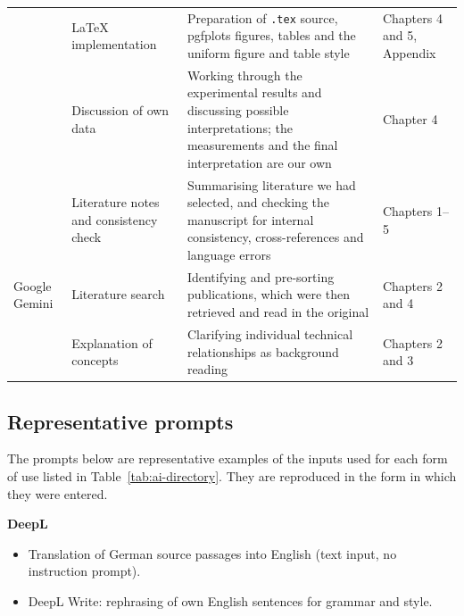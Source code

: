\begin{table}[H]
\begin{tabularx}{\textwidth}{L{2.2cm} L{3.0cm} X L{2.6cm}}
&
\LaTeX{} implementation &
Preparation of \texttt{.tex} source, pgfplots figures, tables and the uniform
figure and table style &
Chapters 4 and 5, Appendix \\
\addlinespace

&
Discussion of own data &
Working through the experimental results and discussing possible interpretations;
the measurements and the final interpretation are our own &
Chapter 4 \\
\addlinespace

&
Literature notes and consistency check &
Summarising literature we had selected, and checking the manuscript for internal
consistency, cross-references and language errors &
Chapters 1--5 \\
\addlinespace
\midrule

Google Gemini &
Literature search &
Identifying and pre-sorting publications, which were then retrieved and read in
the original &
Chapters 2 and 4 \\
\addlinespace

&
Explanation of concepts &
Clarifying individual technical relationships as background reading &
Chapters 2 and 3 \\

\bottomrule
\end{tabularx}
\end{table}

\vspace{1em}

\subsection{Representative prompts}
\label{subsec:ai-prompts}

The prompts below are representative examples of the inputs used for each form of
use listed in Table~\ref{tab:ai-directory}. They are reproduced in the form in
which they were entered.

\vspace{0.5em}
\noindent\textbf{DeepL}
\begin{itemize}
	\setlength{\itemsep}{0.2em}
	\item Translation of German source passages into English (text input, no
	instruction prompt).
	\item DeepL Write: rephrasing of own English sentences for grammar and style.
\end{itemize}

